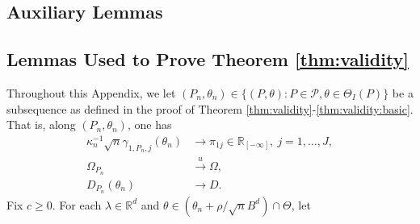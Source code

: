 \documentclass[letterpaper,11pt]{article}
\theoremstyle{myplain}
\theoremstyle{mydefinition}
\theoremstyle{myremark}
\newcommand{\uni}{\stackrel{u}{\rightarrow}}
\newcommand{\R}{\mathbb{R}}
\newcommand{\cP}{\mathcal{P}}
\newcommand{\thetnprime}{(\theta_n +\rho /\sqrt{n} B^d)\cap \Theta}
\numberwithin{equation}{section}
\numberwithin{figure}{section}
\begin{document}
\begin{appendices}
\section{Auxiliary Lemmas}
\label{app:Lemma}

\subsection{Lemmas Used to Prove Theorem \ref{thm:validity}}
Throughout this Appendix, we let $(P_n,\theta_n)\in \{(P,\theta):P \in \cP,\theta \in \Theta_I(P)\}$ be a subsequence as defined in the proof of Theorem \ref{thm:validity}-\ref{thm:validity:basic}. That is, along $(P_n,\theta_n)$, one has
\begin{align}
\kappa_n^{-1}\sqrt{n}\gamma_{1,P_n,j}(\theta_n) &\to \pi_{1j} \in \R_{[-\infty]},~j=1,\dots,J,\label{eq:subseq1}\\
\Omega_{P_n} &\uni \Omega,\label{eq:subseq2}\\
D_{P_n}(\theta_n) &\to D.\label{eq:subseq3}
\end{align}
Fix $c \ge 0$.
For each $\lambda\in\R^d$ and $\theta \in \thetnprime$, let
\begin{align}


\end{align}
\end{appendices}
\end{document}
